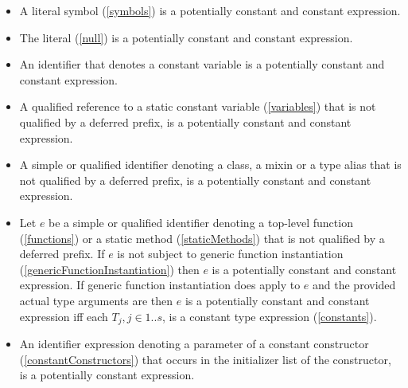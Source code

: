 \documentclass[makeidx]{article}
\begin{document}
{\begin{itemize}
\item
  A literal symbol (\ref{symbols}) is
  a potentially constant and constant expression.

\item
  The literal \NULL{} (\ref{null}) is
  a potentially constant and constant expression.

\item
  An identifier that denotes a constant variable is
  a potentially constant and constant expression.

\item
  A qualified reference to a static constant variable
  (\ref{variables})
  that is not qualified by a deferred prefix,
  is a potentially constant and constant expression.

\item
  A simple or qualified identifier denoting a class,
  a mixin or a type alias that is not qualified by a deferred prefix,
  is a potentially constant and constant expression.

\item
  Let $e$ be a simple or qualified identifier denoting
  a top-level function (\ref{functions})
  or a static method (\ref{staticMethods})
  that is not qualified by a deferred prefix.
  If $e$ is not subject to generic function instantiation
  (\ref{genericFunctionInstantiation})
  then $e$ is a potentially constant and constant expression.
  If generic function instantiation does apply to $e$
  and the provided actual type arguments are 
  then $e$ is a potentially constant and constant expression
  if{}f each $T_j, j \in 1 .. s$, is a constant type expression
  (\ref{constants}).

\item
  An identifier expression denoting a parameter of a constant constructor
  (\ref{constantConstructors})
  that occurs in the initializer list of the constructor,
  is a potentially constant expression.


\end{itemize}}
\end{document}
